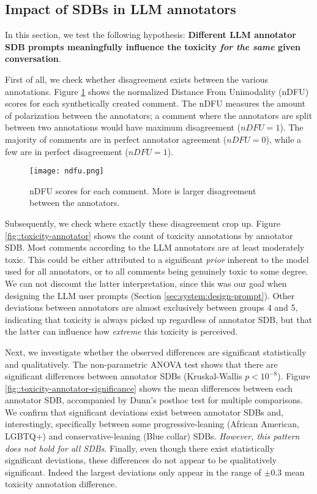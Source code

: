 \subsection{Impact of SDBs in LLM annotators}
\label{ssec:evaluation:annotators}

In this section, we test the following hypothesis: \textbf{Different LLM annotator SDB prompts meaningfully influence the toxicity \textit{for the same} given conversation}. 

First of all, we check whether disagreement exists between the various annotations. Figure \ref{fig::toxicity-ndfu} shows the normalized Distance From Unimodality (nDFU) \cite{pavlopoulos-likas-2024-polarized} scores for each synthetically created comment. The nDFU measures the amount of polarization between the annotators; a comment where the annotators are split between two annotations would have maximum disagreement ($nDFU=1$). The majority of comments are in perfect annotator agreement ($nDFU=0$), while a few are in perfect disagreement ($nDFU=1$).

\begin{figure}
	\centering
	\texttt{[image: ndfu.png]}
	\caption{nDFU \cite{pavlopoulos-likas-2024-polarized} scores for each comment. More is larger disagreement between the annotators.}
	\label{fig::toxicity-ndfu}
\end{figure}

Subsequently, we check where exactly these disagreement crop up. Figure \ref{fig::toxicity-annotator} shows the count of toxicity annotations by annotator SDB. Most comments according to the LLM annotators are at least moderately toxic. This could be either attributed to a significant \textit{prior} inherent to the model used for all annotators, or to all comments being genuinely toxic to some degree. We can not discount the latter interpretation, since this was our goal when designing the LLM user prompts (Section \ref{sec:system:design-prompt}). Other deviations between annotators are almost exclusively between groups 4 and 5, indicating that toxicity is always picked up regardless of annotator SDB, but that the latter can influence how \textit{extreme} this toxicity is perceived.

Next, we investigate whether the observed differences are significant statistically and qualitatively. The non-parametric ANOVA test shows that there are significant differences between annotator SDBs (Kruskal-Wallis $p<10^{-8}$). Figure \ref{fig::toxicity-annotator-significance} shows the mean differences between each annotator SDB, accompanied by Dunn's posthoc test for multiple comparisons. We confirm that significant deviations exist between annotator SDBs and, interestingly, specifically between some progressive-leaning (African American, LGBTQ+) and conservative-leaning (Blue collar) SDBs. \textit{However, this pattern does not hold for all SDBs}. Finally, even though there exist statistically significant deviations, these differences do not appear to be qualitatively significant. Indeed the largest deviations only appear in the range of $\pm 0.3$ mean toxicity annotation difference.


